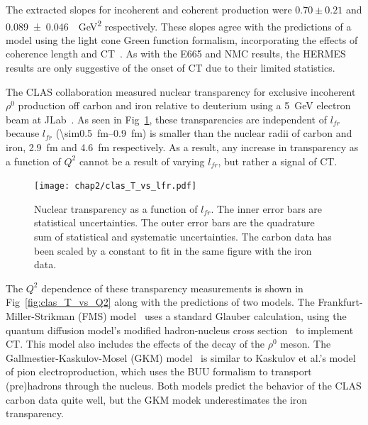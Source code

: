 The extracted slopes for incoherent and coherent production were $0.70\pm0.21$
and \SI{0.089\pm0.046}{\per\giga\electronvolt\squared} respectively.
These slopes agree with the predictions of a model using the light cone Green
function formalism, incorporating the effects of coherence length and
CT~\cite{Kopeliovich_2002}.
As with the E665 and NMC results, the HERMES results are only suggestive of the
onset of CT due to their limited statistics.


The CLAS collaboration measured nuclear transparency for exclusive
incoherent $\rho^0$ production off carbon and iron relative to deuterium using
a \SI{5}{\giga\electronvolt} electron beam at JLab~\cite{ElFassi_2012}.
As seen in Fig~\ref{fig:clas_T_vs_lfr}, these transparencies are independent of
$l_{fr}$ because $l_{fr}$ (\SIrange{\sim0.5}{0.9}{\femto\meter}) is smaller
than the nuclear radii of carbon and iron, \SI{2.9}{\femto\meter} and
\SI{4.6}{\femto\meter} respectively.
As a result, any increase in transparency as a function of $Q^2$ cannot be a
result of varying $l_{fr}$, but rather a signal of CT.

\begin{figure}[!h]
    \centering
    \texttt{[image: chap2/clas\_T\_vs\_lfr.pdf]}
    \caption[Nuclear transparency as a function of $l_{fr}$.]{
            Nuclear transparency as a function of $l_{fr}$.
            The inner error bars are statistical uncertainties.
            The outer error bars are the quadrature sum of statistical and
            systematic uncertainties.
            The carbon data has been scaled by a constant to fit in the same
            figure with the iron data.
            }
    \label{fig:clas_T_vs_lfr}
\end{figure}

The $Q^2$ dependence of these transparency measurements is shown in
Fig~\ref{fig:clas_T_vs_Q2} along with the predictions of two models.
The Frankfurt-Miller-Strikman (FMS) model~\cite{Frankfurt_2008} uses a standard
Glauber calculation, using the quantum diffusion model's modified
hadron-nucleus cross section~\cite{Farrar_1988} to implement CT. This model
also includes the effects of the decay of the $\rho^0$ meson.
The Gallmestier-Kaskulov-Mosel (GKM) model~\cite{Gallmeister_2011} is similar
to Kaskulov et al.'s model~\cite{Kaskulov_2008} of pion electroproduction,
which uses the BUU formalism to transport (pre)hadrons through the nucleus.
Both models predict the behavior of the CLAS carbon data quite well, but the
GKM modek underestimates the iron transparency.

